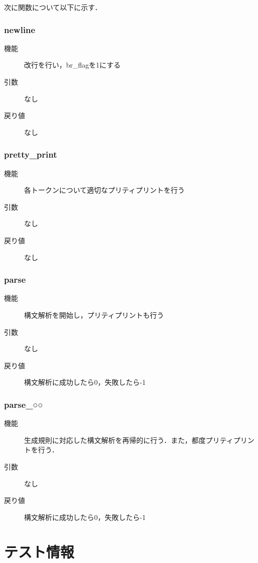 \documentclass{jlreq}
\begin{document}
次に関数について以下に示す．

\subsubsection{newline}
\begin{description}
  \item[機能] 改行を行い，br\_flagを1にする
  \item[引数] なし
  \item[戻り値] なし
\end{description}

\subsubsection{pretty\_print}
\begin{description}
  \item[機能] 各トークンについて適切なプリティプリントを行う
  \item[引数] なし
  \item[戻り値] なし
\end{description}

\subsubsection{parse}
\begin{description}
  \item[機能] 構文解析を開始し，プリティプリントも行う
  \item[引数] なし
  \item[戻り値] 構文解析に成功したら0，失敗したら-1
\end{description}

\subsubsection{parse\_○○}
\begin{description}
  \item[機能] 生成規則に対応した構文解析を再帰的に行う．また，都度プリティプリントを行う．
  \item[引数] なし
  \item[戻り値] 構文解析に成功したら0，失敗したら-1
\end{description}

\section{テスト情報}
\end{document}

